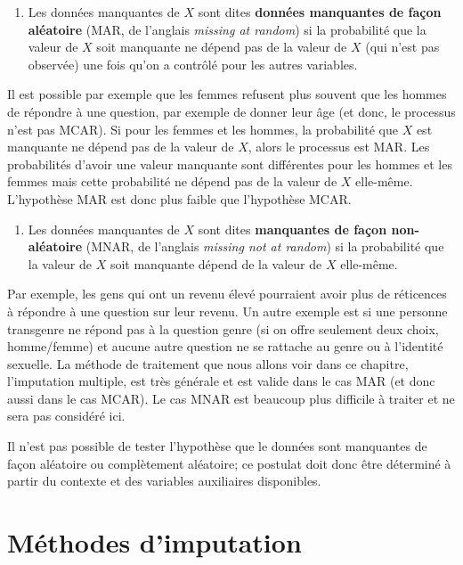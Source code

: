 \documentclass[
  11pt,
  letterpaper,
]{scrbook}
\providecommand{\tightlist}{%
  \setlength{\itemsep}{0pt}\setlength{\parskip}{0pt}}\usepackage{longtable,booktabs,array}
\theoremstyle{definition}
\theoremstyle{remark}
\begin{document}
\begin{enumerate}
\def\labelenumi{\arabic{enumi})}
\setcounter{enumi}{1}
\tightlist
\item
  Les données manquantes de \(X\) sont dites \textbf{données manquantes
  de façon aléatoire} (MAR, de l'anglais \emph{missing at random}) si la
  probabilité que la valeur de \(X\) soit manquante ne dépend pas de la
  valeur de \(X\) (qui n'est pas observée) une fois qu'on a contrôlé
  pour les autres variables.
\end{enumerate}

Il est possible par exemple que les femmes refusent plus souvent que les
hommes de répondre à une question, par exemple de donner leur âge (et
donc, le processus n'est pas MCAR). Si pour les femmes et les hommes, la
probabilité que \(X\) est manquante ne dépend pas de la valeur de \(X\),
alors le processus est MAR. Les probabilités d'avoir une valeur
manquante sont différentes pour les hommes et les femmes mais cette
probabilité ne dépend pas de la valeur de \(X\) elle-même. L'hypothèse
MAR est donc plus faible que l'hypothèse MCAR.

\begin{enumerate}
\def\labelenumi{\arabic{enumi})}
\setcounter{enumi}{2}
\tightlist
\item
  Les données manquantes de \(X\) sont dites \textbf{manquantes de façon
  non-aléatoire} (MNAR, de l'anglais \emph{missing not at random}) si la
  probabilité que la valeur de \(X\) soit manquante dépend de la valeur
  de \(X\) elle-même.
\end{enumerate}

Par exemple, les gens qui ont un revenu élevé pourraient avoir plus de
réticences à répondre à une question sur leur revenu. Un autre exemple
est si une personne transgenre ne répond pas à la question genre (si on
offre seulement deux choix, homme/femme) et aucune autre question ne se
rattache au genre ou à l'identité sexuelle. La méthode de traitement que
nous allons voir dans ce chapitre, l'imputation multiple, est très
générale et est valide dans le cas MAR (et donc aussi dans le cas MCAR).
Le cas MNAR est beaucoup plus difficile à traiter et ne sera pas
considéré ici.

Il n'est pas possible de tester l'hypothèse que le données sont
manquantes de façon aléatoire ou complètement aléatoire; ce postulat
doit donc être déterminé à partir du contexte et des variables
auxiliaires disponibles.

\hypertarget{muxe9thodes-dimputation}{%
\section{Méthodes d'imputation}\label{muxe9thodes-dimputation}}
\end{document}
